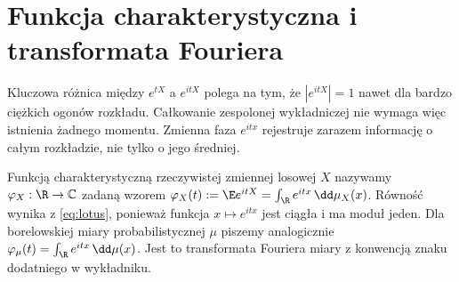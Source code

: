 \section{Funkcja charakterystyczna i transformata Fouriera}

Kluczowa różnica między $e^{tX}$ a $e^{itX}$ polega na tym,
że $|e^{itX}|=1$ nawet dla bardzo ciężkich ogonów rozkładu.
Całkowanie zespolonej wykładniczej nie wymaga więc istnienia
żadnego momentu. Zmienna faza $e^{itx}$ rejestruje zarazem
informację o całym rozkładzie, nie tylko o jego średniej.

\begin{definicja}
Funkcją charakterystyczną rzeczywistej zmiennej losowej $X$
nazywamy $\varphi_X:\R\to\mathbb C$ zadaną wzorem
$\varphi_X(t):=\E e^{itX}=\int_\R e^{itx}\,\dd\mu_X(x)$.
Równość wynika z \eqref{eq:lotus}, ponieważ funkcja
$x\mapsto e^{itx}$ jest ciągła i ma moduł jeden.
Dla borelowskiej miary probabilistycznej $\mu$ piszemy
analogicznie $\varphi_\mu(t)=\int_\R e^{itx}\,\dd\mu(x)$.
Jest to transformata Fouriera miary z konwencją znaku
dodatniego w wykładniku.
\end{definicja}

